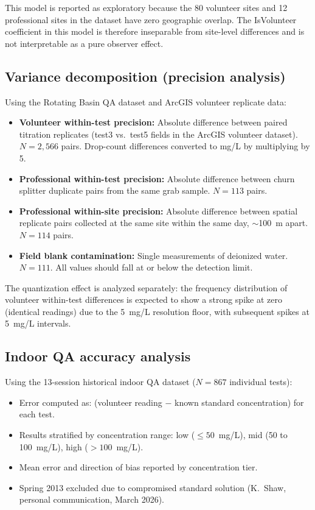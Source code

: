 \documentclass[lineno]{wlpeerj}
\begin{document}
This model is reported as exploratory because the 80 volunteer sites and 12 professional sites in the dataset have zero geographic overlap. The IsVolunteer coefficient in this model is therefore inseparable from site-level differences and is not interpretable as a pure observer effect.

\subsection{Variance decomposition (precision analysis)}
\label{sec:variance}

Using the Rotating Basin QA dataset and ArcGIS volunteer replicate data:

\begin{itemize}
  \item \textbf{Volunteer within-test precision:} Absolute difference between paired titration replicates (test3 vs.\ test5 fields in the ArcGIS volunteer dataset). $N=2{,}566$ pairs. Drop-count differences converted to mg/L by multiplying by 5.
  \item \textbf{Professional within-test precision:} Absolute difference between churn splitter duplicate pairs from the same grab sample. $N=113$ pairs.
  \item \textbf{Professional within-site precision:} Absolute difference between spatial replicate pairs collected at the same site within the same day, $\sim$100~m apart. $N=114$ pairs.
  \item \textbf{Field blank contamination:} Single measurements of deionized water. $N=111$. All values should fall at or below the detection limit.
\end{itemize}

The quantization effect is analyzed separately: the frequency distribution of volunteer within-test differences is expected to show a strong spike at zero (identical readings) due to the 5~mg/L resolution floor, with subsequent spikes at 5~mg/L intervals.

\subsection{Indoor QA accuracy analysis}

Using the 13-session historical indoor QA dataset ($N=867$ individual tests):

\begin{itemize}
  \item Error computed as: (volunteer reading $-$ known standard concentration) for each test.
  \item Results stratified by concentration range: low ($\leq 50$~mg/L), mid (50 to 100~mg/L), high ($> 100$~mg/L).
  \item Mean error and direction of bias reported by concentration tier.
  \item Spring 2013 excluded due to compromised standard solution (K.\ Shaw, personal communication, March 2026).
\end{itemize}
\end{document}
